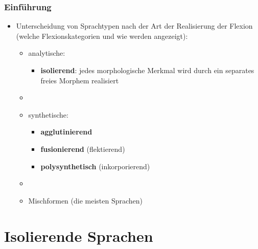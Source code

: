 \begin{frame}
\frametitle{Einführung}

\begin{itemize}
	\item Unterscheidung von Sprachtypen nach der Art der Realisierung der Flexion (welche Flexionskategorien und wie werden angezeigt):
	
	\begin{itemize}
		\item analytische:
		
		\begin{itemize}
			\item \textbf{isolierend}: jedes morphologische Merkmal wird durch ein separates freies Morphem realisiert
		\end{itemize}
		
		\item[]
		\item synthetische:
		
		\begin{itemize}
			\item \textbf{agglutinierend}
			\item \textbf{fusionierend} (flektierend)
			\item \textbf{polysynthetisch} (inkorporierend)
		\end{itemize}
		
		\item[]
		\item Mischformen (die meisten Sprachen)
	\end{itemize}
\end{itemize}


\end{frame}


\section{Isolierende Sprachen}


